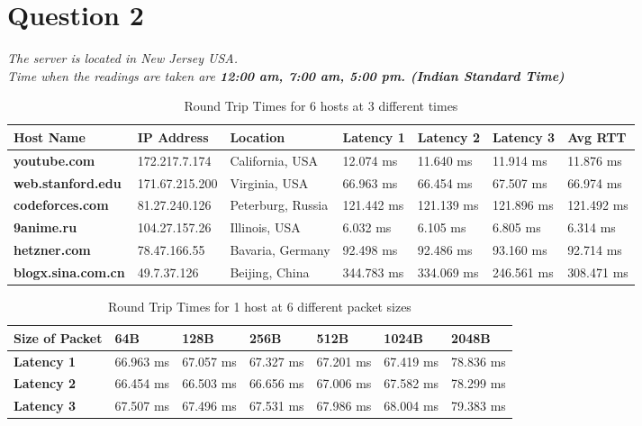 \documentclass[a4paper,10pt]{article}
\begin{document}
\section*{Question 2}
\textit{The server is located in New Jersey USA.\\
Time when the readings are taken are \textbf{12:00 am, 7:00 am, 5:00 pm. (Indian Standard Time)}}
\vspace{-0.2cm}
\begin{table}[h]
	\begin{tabularx}{\textwidth}{|p{85pt}||p{75pt}||p{80pt}||X||X||X||X|}
		\hline
		\rowcolor{cyan!40}
		\textbf{Host Name} & \textbf{IP Address} & \textbf{Location} & \textbf{Latency 1} & \textbf{Latency 2} & \textbf{Latency 3} & \textbf{Avg RTT} \\ \hline
		\textbf{youtube.com}  & 172.217.7.174 & California, USA & 12.074 	ms & 11.640 ms & 11.914 ms & 11.876 ms\\ \hline
		\textbf{web.stanford.edu}  & 171.67.215.200 & Virginia, USA & 66.963 ms & 66.454 ms & 67.507 ms & 66.974 ms\\ \hline
		\textbf{codeforces.com} & 81.27.240.126 & Peterburg, Russia & 121.442 ms & 121.139 ms & 121.896 ms & 121.492 ms\\ \hline
		\textbf{9anime.ru}  & 104.27.157.26 & Illinois, USA & 6.032 ms & 6.105 ms & 6.805 ms & 6.314 ms\\ \hline
		\textbf{hetzner.com} & 78.47.166.55 & Bavaria, Germany & 92.498 ms & 92.486 ms & 93.160 ms & 92.714 ms\\ \hline
		\textbf{blogx.sina.com.cn}& 49.7.37.126 & Beijing, China & 344.783 ms & 334.069 ms & 246.561 ms & 308.471 ms\\ \hline
	\end{tabularx}
	\caption{Round Trip Times for 6 hosts at 3 different times}
\end{table}
\vspace{-0.2cm}
\begin{table}[h]
	\begin{tabularx}{\textwidth}{|p{130pt}||X||X||X||X||X||X|}
		\hline
		\rowcolor{cyan!40}
		\textbf{Size of Packet} & \textbf{64B} & \textbf{128B} & \textbf{256B} & \textbf{512B}& \textbf{1024B}  & \textbf{2048B} \\ \hline
		\textbf{Latency 1} & 66.963 ms & 67.057 ms & 67.327 ms & 67.201 ms & 67.419 ms & 78.836 ms\\ \hline
		\textbf{Latency 2} & 66.454 ms & 66.503 ms & 66.656 ms & 67.006 ms & 67.582 ms& 78.299 ms\\ \hline
		\textbf{Latency 3} & 67.507 ms & 67.496 ms & 67.531 ms & 67.986 ms & 68.004 ms & 79.383 ms\\ \hline
	\end{tabularx}
	\caption{Round Trip Times for 1 host at 6 different packet sizes}
\end{table}
\end{document}
